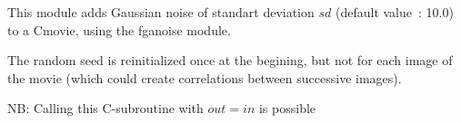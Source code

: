 This module adds Gaussian noise of standart deviation $sd$ (default value~:
10.0) to a Cmovie, using the {\sf fganoise} module.

\vskip 0.3cm

The random seed is reinitialized once at the begining, but not for each 
image of the movie (which could create correlations between successive
images).

\vskip 0.5cm

NB: Calling this C-subroutine with $out=in$ is possible 